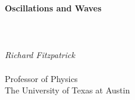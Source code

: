 \documentclass[12pt]{rfbook}
\begin{document}
\pagestyle{fancy}
\renewcommand{\chaptermark}[1]{\markboth{#1}{}}
\fancyhf{}
\fancyhead[LO,RE]{\sl \leftmark}
\fancyhead[LE,RO]{\sl \thepage}

\thispagestyle{empty}
\begin{center}
{\Huge\bf Oscillations and Waves}\\[1ex]
~\\
~\\
~\\
{\Large\em  Richard Fitzpatrick}\\[1.5ex]~\\[1.5ex]
{\Large\sf  Professor  of Physics}\\[1.5ex]
{\Large\sf  The University of Texas at Austin}\\[10ex]
\end{center}

\tableofcontents













\appendix

\end{document}

